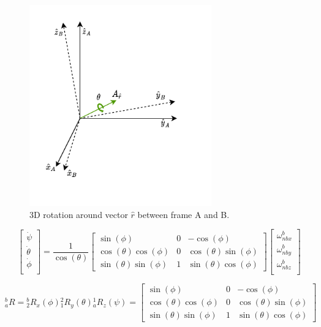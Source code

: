 \begin{figure}[!h]
    \centering
    \includegraphics[width=0.7\textwidth]{figures/rotation.pdf}
    \caption{ 3D rotation around vector $\hat{r}$ between frame A and B. }
    \label{fig:rotation}
\end{figure}

\begin{equation}
    \begin{bmatrix}
        \dot{\psi}   \\
        \dot{\theta} \\
        \dot{\phi}   \\
    \end{bmatrix}
    =
    \frac{1}{\cos(\theta)}
    \begin{bmatrix}
        \sin(\phi)             & 0 & -\cos(\phi)            \\
        \cos(\theta)\cos(\phi) & 0 & \cos(\theta)\sin(\phi) \\
        \sin(\theta)\sin(\phi) & 1 & \sin(\theta)\cos(\phi)
    \end{bmatrix}
    \begin{bmatrix}
        \omega{^b_{nbx}} \\
        \omega{^b_{nby}} \\
        \omega{^b_{nbz}} \\
    \end{bmatrix}
    \label{eq:euler_equation}
\end{equation}

\begin{equation}
    {^b_a}R = {^b_2}R_x(\phi){^2_1}R_y(\theta){^1_a}R_z(\psi)
    =
    \begin{bmatrix}
        \sin(\phi)             & 0 & -\cos(\phi)            \\
        \cos(\theta)\cos(\phi) & 0 & \cos(\theta)\sin(\phi) \\
        \sin(\theta)\sin(\phi) & 1 & \sin(\theta)\cos(\phi)
    \end{bmatrix}
    \label{eq:euler_equations}
\end{equation}

